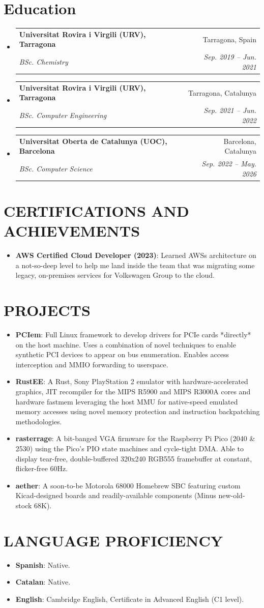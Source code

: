 \documentclass[letterpaper,11pt]{article}
\makeatletter
\newcommand{\resumeItem}[2]{
  \item\small{
    \textbf{#1}{: #2 \vspace{-2pt}}
  }
}
\newcommand{\resumeSubheading}[4]{
  \vspace{-1pt}\item
    \begin{tabular*}{0.97\textwidth}{l@{\extracolsep{\fill}}r}
      \textbf{#1} & #2 \\
      \textit{\small#3} & \textit{\small #4} \\
    \end{tabular*}\vspace{-5pt}
}
\newcommand{\resumeSubItem}[2]{\resumeItem{#1}{#2}\vspace{-4pt}}
\newcommand{\resumeSubHeadingListStart}{\begin{itemize}[leftmargin=*]}
\newcommand{\resumeSubHeadingListEnd}{\end{itemize}}
\makeatother
\begin{document}
\section{Education}
  \resumeSubHeadingListStart
    \resumeSubheading
      {Universitat Rovira i Virgili (URV), Tarragona}{Tarragona, Spain}
      {BSc. Chemistry}{Sep. 2019 -- Jun. 2021}
    \resumeSubheading
      {Universitat Rovira i Virgili (URV), Tarragona}{Tarragona, Catalunya}
      {BSc. Computer Engineering}{Sep. 2021 -- Jun. 2022}
    \resumeSubheading
      {Universitat Oberta de Catalunya (UOC), Barcelona}{Barcelona, Catalunya}
      {BSc. Computer Science}{Sep. 2022 -- May. 2026}
  \resumeSubHeadingListEnd



\section{CERTIFICATIONS AND ACHIEVEMENTS}
  \resumeSubHeadingListStart
    \resumeSubItem{AWS Certified Cloud Developer (2023)}
      {Learned AWSs architecture on a not-so-deep level to help me land inside the team that was migrating some legacy, on-premises services for Volkswagen Group to the cloud.}
  \resumeSubHeadingListEnd
  
\section{PROJECTS}
  \resumeSubHeadingListStart
    \resumeSubItem{PCIem}
      {Full Linux framework to develop drivers for PCIe cards *directly* on the host machine. Uses a combination of novel techniques to enable synthetic PCI devices to appear on bus enumeration. Enables access interception and MMIO forwarding to userspace.}
    \resumeSubItem{RustEE}
      {A Rust, Sony PlayStation 2 emulator with hardware-accelerated graphics, JIT recompiler for the MIPS R5900 and MIPS R3000A cores and hardware fastmem leveraging the host MMU for native-speed emulated memory accesses using novel memory protection and instruction backpatching methodologies.}
    \resumeSubItem{rasterrage}
      {A bit-banged VGA firmware for the Raspberry Pi Pico (2040 \& 2530) using the Pico's PIO state machines and cycle-tight DMA. Able to display tear-free, double-buffered 320x240 RGB555 framebuffer at constant, flicker-free 60Hz.}
    \resumeSubItem{aether}
      {A soon-to-be Motorola 68000 Homebrew SBC featuring custom Kicad-designed boards and readily-available components (Minus new-old-stock 68K).}
  \resumeSubHeadingListEnd
  
\section{LANGUAGE PROFICIENCY}
  \resumeSubHeadingListStart
    \resumeSubItem{Spanish}
      {Native.}
    \resumeSubItem{Catalan}
      {Native.}
    \resumeSubItem{English}
      {Cambridge English, Certificate in Advanced English (C1 level).}
  \resumeSubHeadingListEnd

%
\end{document}
